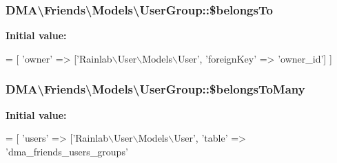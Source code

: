 \subsubsection[{\$belongs\+To}]{\setlength{\rightskip}{0pt plus 5cm}D\+M\+A\textbackslash{}\+Friends\textbackslash{}\+Models\textbackslash{}\+User\+Group\+::\$belongs\+To}\label{classDMA_1_1Friends_1_1Models_1_1UserGroup_a941362fd666e66db70f4b5951cba0154}
{\bfseries Initial value\+:}
\begin{DoxyCode}
= [
        \textcolor{stringliteral}{'owner'} => [\textcolor{stringliteral}{'Rainlab\(\backslash\)User\(\backslash\)Models\(\backslash\)User'}, \textcolor{stringliteral}{'foreignKey'} => \textcolor{stringliteral}{'owner\_id'}]    
    ]
\end{DoxyCode}
\hypertarget{classDMA_1_1Friends_1_1Models_1_1UserGroup_a09a5f57f3092a3bf0aa240cf8ca949a8}{}
\subsubsection[{\$belongs\+To\+Many}]{\setlength{\rightskip}{0pt plus 5cm}D\+M\+A\textbackslash{}\+Friends\textbackslash{}\+Models\textbackslash{}\+User\+Group\+::\$belongs\+To\+Many}\label{classDMA_1_1Friends_1_1Models_1_1UserGroup_a09a5f57f3092a3bf0aa240cf8ca949a8}
{\bfseries Initial value\+:}
\begin{DoxyCode}
= [
        \textcolor{stringliteral}{'users'} => [\textcolor{stringliteral}{'Rainlab\(\backslash\)User\(\backslash\)Models\(\backslash\)User'}, 
            \textcolor{stringliteral}{'table'}         => \textcolor{stringliteral}{'dma\_friends\_users\_groups'}
\end{DoxyCode}
\hypertarget{classDMA_1_1Friends_1_1Models_1_1UserGroup_ad71c8521c1767d621fe10ea3ce822c3c}{}
